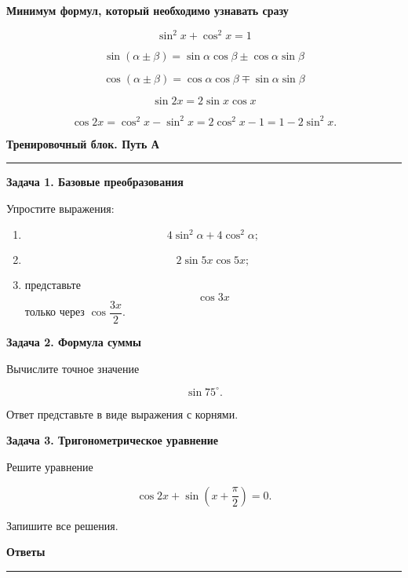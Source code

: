 \documentclass[a4paper,12pt]{article}
\newcommand{\maintitle}[1]{%
  {\Large\bfseries\color{darkaccent}#1\par}
  \vspace{0.5em}
  {\color{accent}\rule{\linewidth}{0.7pt}\par}
  \vspace{0.8em}
}
\newcommand{\subheading}[1]{%
  \vspace{0.7em}
  {\large\bfseries\color{darkaccent}#1\par}
  \vspace{0.25em}
}
\begin{document}
\subheading{Минимум формул, который необходимо узнавать сразу}

\[
\sin^2x+\cos^2x=1
\]

\[
\sin(\alpha\pm\beta)
=
\sin\alpha\cos\beta
\pm
\cos\alpha\sin\beta
\]

\[
\cos(\alpha\pm\beta)
=
\cos\alpha\cos\beta
\mp
\sin\alpha\sin\beta
\]

\[
\sin2x=2\sin x\cos x
\]

\[
\cos2x
=
\cos^2x-\sin^2x
=
2\cos^2x-1
=
1-2\sin^2x.
\]

\clearpage
\thispagestyle{fancy}

\maintitle{Тренировочный блок. Путь А}

\textbf{Задача 1. Базовые преобразования}

Упростите выражения:

\begin{enumerate}[label=\alph*)]
  \item
  \[
  4\sin^2\alpha+4\cos^2\alpha;
  \]

  \item
  \[
  2\sin5x\cos5x;
  \]

  \item представьте
  \[
  \cos3x
  \]
  только через \(\cos\dfrac{3x}{2}\).
\end{enumerate}

\vspace{8mm}

\textbf{Задача 2. Формула суммы}

Вычислите точное значение

\[
\sin75^\circ.
\]

Ответ представьте в виде выражения с корнями.

\vspace{10mm}

\textbf{Задача 3. Тригонометрическое уравнение}

Решите уравнение

\[
\cos2x+\sin\left(x+\frac{\pi}{2}\right)=0.
\]

Запишите все решения.

\clearpage
\thispagestyle{fancy}

\maintitle{Ответы}

\renewcommand{\arraystretch}{1.45}
\end{document}
